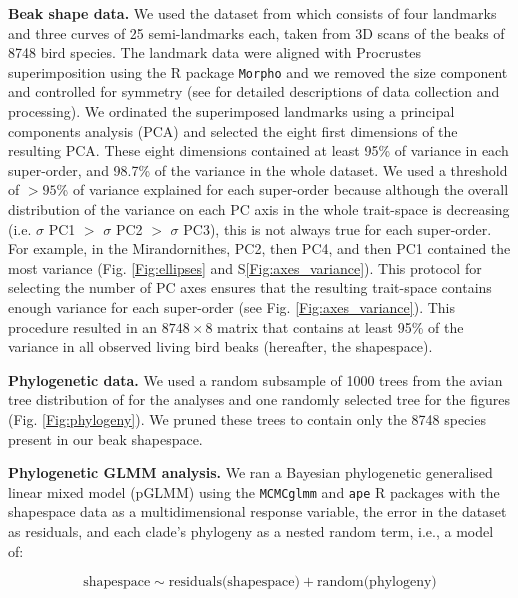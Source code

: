 \documentclass[12pt,letterpaper]{article}
\begin{document}
\textbf{Beak shape data.} We used the dataset from \cite{cooney2017mega,hughes2022global,chira2020signature} which consists of four landmarks and three curves of 25 semi-landmarks each, taken from 3D scans of the beaks of 8748 bird species.
The landmark data were aligned with Procrustes superimposition using the R package \texttt{Morpho} \cite{Rcore,Morpho} and we removed the size component and controlled for symmetry (see \cite{cooney2017mega,hughes2022global,chira2020signature} for detailed descriptions of data collection and processing).
We ordinated the superimposed landmarks using a principal components analysis (PCA) and selected the eight first dimensions of the resulting PCA.
These eight dimensions contained at least 95\% of variance in each super-order, and 98.7\% of the variance in the whole dataset.
We used a threshold of $>95$\% of variance explained for each super-order because although the overall distribution of the variance on each PC axis in the whole trait-space is decreasing (i.e. $\sigma$ PC1 $>$ $\sigma$ PC2 $>$ $\sigma$ PC3), this is not always true for each super-order.
For example, in the Mirandornithes, PC2, then PC4, and then PC1 contained the most variance (Fig.
\ref{Fig:ellipses} and S\ref{Fig:axes_variance}).
This protocol for selecting the number of PC axes ensures that the resulting trait-space contains enough variance for each super-order (see Fig. \ref{Fig:axes_variance}).
This procedure resulted in an $8748 \times 8$ matrix that contains at least 95\% of the variance in all observed living bird beaks (hereafter, the shapespace). %

\textbf{Phylogenetic data.} We used a random subsample of 1000 trees from the avian tree distribution of \cite{jetz2012global} for the analyses and one randomly selected tree for the figures (Fig. \ref{Fig:phylogeny}).
We pruned these trees to contain only the 8748 species present in our beak shapespace.

\textbf{Phylogenetic GLMM analysis.} We ran a Bayesian phylogenetic generalised linear mixed model (pGLMM) using the \texttt{MCMCglmm} and \texttt{ape} R packages \cite{MCMCglmm, ape} with the shapespace data as a multidimensional response variable, the error in the dataset as residuals, and each clade's phylogeny as a nested random term, i.e., a model of:

\begin{equation}
\text{shapespace} \mathtt{\sim} \text{residuals(shapespace)} + \text{random(phylogeny)}
\end{equation}
\end{document}
